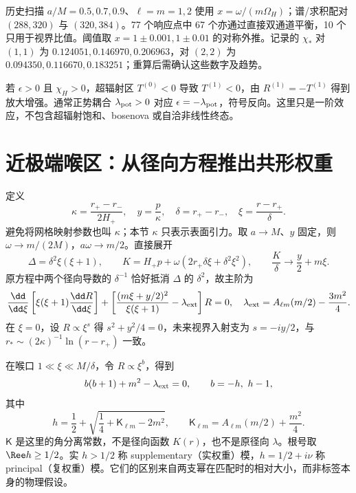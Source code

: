 历史扫描 $a/M=0.5,0.7,0.9$、$\ell=m=1,2$ 使用 $x=\omega/(m\Omega_H)$；谱/求积配对 $(288,320)$ 与 $(320,384)$。77 个响应点中 67 个亦通过直接双通道平衡，10 个只用于视界比值。阈值取 $x=1\pm0.001,1\pm0.01$ 的对称外推。记录的 $\chi_*$ 对 $(1,1)$ 为 $0.124051,0.146970,0.206963$，对 $(2,2)$ 为 $0.094350,0.116670,0.183251$；重算后需确认这些数字及趋势。

若 $\epsilon>0$ 且 $\chi_H>0$，超辐射区 $T^{(0)}<0$ 导致 $T^{(1)}<0$，由 $R^{(1)}=-T^{(1)}$ 得到放大增强。通常正势耦合 $\lambda_{\rm pot}>0$ 对应 $\epsilon=-\lambda_{\rm pot}$，符号反向。这里只是一阶效应，不包含超辐射饱和、bosenova 或自洽非线性终态。

\section{近极端喉区：从径向方程推出共形权重}
\label{sec:new-throat}
定义
\begin{equation}
 \kappa=\frac{r_+-r_-}{2H_+},\quad y=\frac p\kappa,\quad
 \delta=r_+-r_-,\quad \xi=\frac{r-r_+}{\delta}.
\end{equation}
避免将网格映射参数也叫 $\kappa$；本节 $\kappa$ 只表示表面引力。取 $a\to M$、$y$ 固定，则 $\omega\to m/(2M)$，$a\omega\to m/2$。直接展开
\begin{equation}
 \Delta=\delta^2\xi(\xi+1),\qquad
 K=H_+p+\omega(2r_+\delta\xi+\delta^2\xi^2),\qquad
 \frac K\delta\to\frac y2+m\xi.
\end{equation}
原方程中两个径向导数的 $\delta^{-1}$ 恰好抵消 $\Delta$ 的 $\delta^2$，故主阶为
\begin{equation}
 \frac{\dd}{\dd\xi}\left[\xi(\xi+1)\frac{\dd R}{\dd\xi}\right]
 +\left[\frac{(m\xi+y/2)^2}{\xi(\xi+1)}-\lambda_{\rm ext}\right]R=0,
 \quad\lambda_{\rm ext}=A_{\ell m}(m/2)-\frac{3m^2}{4}.
\label{eq:new-near-ode}
\end{equation}
在 $\xi=0$，设 $R\propto\xi^s$ 得 $s^2+y^2/4=0$，未来视界入射支为 $s=-iy/2$，与 $r_*\sim(2\kappa)^{-1}\ln(r-r_+)$ 一致。

在喉口 $1\ll\xi\ll M/\delta$，令 $R\propto\xi^b$，得到
\begin{equation}
 b(b+1)+m^2-\lambda_{\rm ext}=0,
 \qquad b=-h,\ h-1,
\end{equation}
其中
\begin{equation}
 \boxed{h=\frac12+\sqrt{\frac14+\mathsf K_{\ell m}-2m^2},\qquad
 \mathsf K_{\ell m}=A_{\ell m}(m/2)+\frac{m^2}{4}.}
\end{equation}
$\mathsf K$ 是这里的角分离常数，不是径向函数 $K(r)$，也不是原径向 $\lambda$。根号取 $\Ree h\ge1/2$。实 $h>1/2$ 称 supplementary（实权重）模，$h=1/2+i\nu$ 称 principal（复权重）模。它们的区别来自两支幂在匹配时的相对大小，而非标签本身的物理假设。

